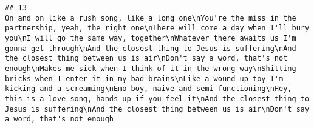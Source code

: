 \documentclass[]{article}
\begin{document}
\begin{verbatim}
## 13                                                                                                                                                                                                                                                                                                                                                                                                                                                                                                                                                                                                                                                                                                                                                                                                                                                                                                                                                                                                                                                                                                                                                                                                                                                                                                                                                                                                                                                                                                                                                                                                                                                                                                                                                                                                                                                                                                                                                                                                                                                                                                                                                                                                                                                                                                                                                                                                      On and on like a rush song, like a long one\nYou're the miss in the partnership, yeah, the right one\nThere will come a day when I'll bury you\nI will go the same way, together\nWhatever there awaits us I'm gonna get through\nAnd the closest thing to Jesus is suffering\nAnd the closest thing between us is air\nDon't say a word, that's not enough\nMakes me sick when I think of it in the wrong way\nShitting bricks when I enter it in my bad brains\nLike a wound up toy I'm kicking and a screaming\nEmo boy, naive and semi functioning\nHey, this is a love song, hands up if you feel it\nAnd the closest thing to Jesus is suffering\nAnd the closest thing between us is air\nDon't say a word, that's not enough

\end{verbatim}
\end{document}
